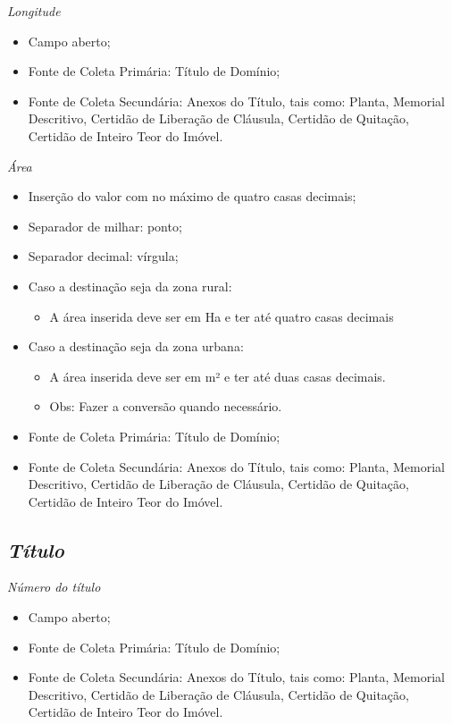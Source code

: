 \documentclass[
  letterpaper,
]{report}
\providecommand{\tightlist}{%
  \setlength{\itemsep}{0pt}\setlength{\parskip}{0pt}}\usepackage{longtable,booktabs,array}
\begin{document}
\emph{Longitude}

\begin{itemize}
\tightlist
\item
  Campo aberto;
\item
  Fonte de Coleta Primária: Título de Domínio;
\item
  Fonte de Coleta Secundária: Anexos do Título, tais como: Planta,
  Memorial Descritivo, Certidão de Liberação de Cláusula, Certidão de
  Quitação, Certidão de Inteiro Teor do Imóvel.
\end{itemize}

\emph{Área}

\begin{itemize}
\tightlist
\item
  Inserção do valor com no máximo de quatro casas decimais;
\item
  Separador de milhar: ponto;
\item
  Separador decimal: vírgula;
\item
  Caso a destinação seja da zona rural:

  \begin{itemize}
  \tightlist
  \item
    A área inserida deve ser em Ha e ter até quatro casas decimais
  \end{itemize}
\item
  Caso a destinação seja da zona urbana:

  \begin{itemize}
  \tightlist
  \item
    A área inserida deve ser em m² e ter até duas casas decimais.
  \item
    Obs: Fazer a conversão quando necessário.
  \end{itemize}
\item
  Fonte de Coleta Primária: Título de Domínio;
\item
  Fonte de Coleta Secundária: Anexos do Título, tais como: Planta,
  Memorial Descritivo, Certidão de Liberação de Cláusula, Certidão de
  Quitação, Certidão de Inteiro Teor do Imóvel.
\end{itemize}

\hypertarget{tuxedtulo}{%
\subsection{\texorpdfstring{\emph{Título}}{Título}}\label{tuxedtulo}}

\emph{Número do título}

\begin{itemize}
\tightlist
\item
  Campo aberto;
\item
  Fonte de Coleta Primária: Título de Domínio;
\item
  Fonte de Coleta Secundária: Anexos do Título, tais como: Planta,
  Memorial Descritivo, Certidão de Liberação de Cláusula, Certidão de
  Quitação, Certidão de Inteiro Teor do Imóvel.
\end{itemize}
\end{document}
